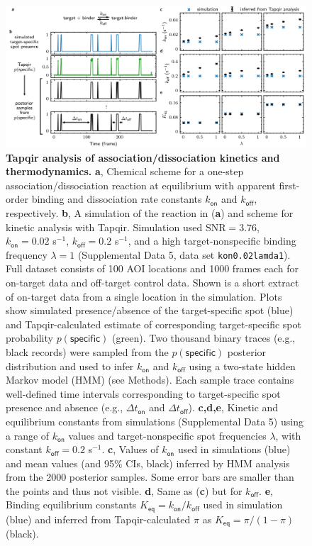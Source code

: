 \clearpage
\pagebreak

\begin{figure}[htbp]
\centering
\includegraphics[width=\textwidth]{figures/figure6.png}
\caption{\textbf{Tapqir analysis of association/dissociation kinetics and thermodynamics.} \textbf{a}, Chemical scheme for a one-step association/dissociation reaction at equilibrium with apparent first-order binding and dissociation rate constants $k_{\mathsf{on}}$ and $k_{\mathsf{off}}$, respectively. \textbf{b}, A simulation of the reaction in (\textbf{a}) and scheme for kinetic analysis with Tapqir. Simulation used $\mathrm{SNR} = 3.76$, $k_\mathsf{on} = 0.02$ s$^{-1}$, $k_\mathsf{off} = 0.2$ s$^{-1}$, and a high target-nonspecific binding frequency $\lambda = 1$ (Supplemental Data 5, data set \texttt{kon0.02lamda1}). Full dataset consists of 100 AOI locations and 1000 frames each for on-target data and off-target control data. Shown is a short extract of on-target data from a single location in the simulation.  Plots show simulated presence/absence of the target-specific spot (blue) and Tapqir-calculated estimate of corresponding target-specific spot probability $p(\mathsf{specific})$ (green). Two thousand binary traces (e.g., black records) were sampled from the $p(\mathsf{specific})$ posterior distribution and used to infer $k_\mathsf{on}$ and $k_\mathsf{off}$ using a two-state hidden Markov model (HMM) (see Methods). Each sample trace contains well-defined time intervals corresponding to target-specific spot presence and absence (e.g., $\Delta t_\mathsf{on}$ and $\Delta t_\mathsf{off}$). \textbf{c,d,e}, Kinetic and equilibrium constants from simulations (Supplemental Data 5) using a range of $k_\mathsf{on}$ values and  target-nonspecific spot frequencies $\lambda$, with constant $k_\mathsf{off} = 0.2$ s$^{-1}$. \textbf{c}, Values of $k_{\mathsf{on}}$ used in simulations (blue) and mean values (and 95\% CIs, black) inferred by HMM analysis from the 2000 posterior samples.  Some error bars are smaller than the points and thus not visible. \textbf{d}, Same as (\textbf{c}) but for $k_{\mathsf{off}}$. \textbf{e},  Binding equilibrium constants $K_{\mathsf{eq}} = k_{\mathsf{on}} / k_{\mathsf{off}}$ used in simulation (blue) and inferred from Tapqir-calculated $\pi$ as $K_{\mathsf{eq}} = \pi / (1 - \pi)$ (black). }
\label{fig:kinetic_analysis}
\end{figure}
\clearpage
\pagebreak


